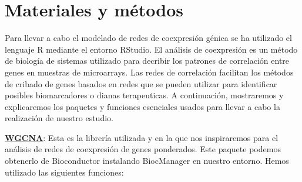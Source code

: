 \documentclass{article}
\begin{document}
	\section{Materiales y métodos}
	
	Para llevar a cabo el modelado de redes de coexpresión génica se ha utilizado el lenguaje R mediante el entorno RStudio. El análisis de coexpresión es un método de biología de sistemas utilizado para decribir los patrones de correlación entre genes en muestras de microarrays. Las redes de correlación facilitan los métodos de cribado de genes basados en redes que se pueden utilizar para identificar posibles biomarcadores o dianas terapeuticas. A continuación, mostraremos y explicaremos los paquetes y funciones esenciales usados para llevar a cabo la realización de nuestro estudio.
	
	\underline{\bfseries{WGCNA}}: Esta es la librería utilizada y en la que nos inspiraremos para el análisis de redes de coexpresión de genes ponderados. Este paquete podemos obtenerlo de Bioconductor instalando BiocManager en nuestro entorno. Hemos utilizado las siguientes funciones:
	
\end{document}
